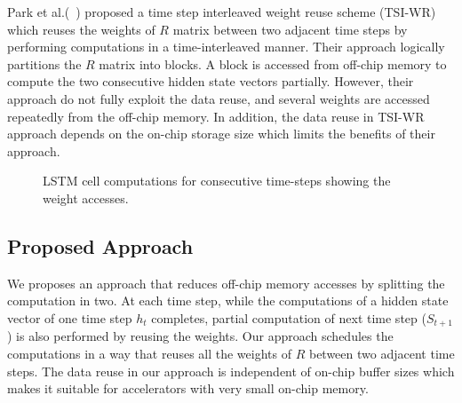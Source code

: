 \documentclass[a4paper,10pt]{article}
\begin{document}
Park et al.(~\cite{park2020time}) proposed a time step interleaved weight reuse scheme (TSI-WR) which reuses the weights of $R$ matrix between two adjacent time steps by performing computations in a time-interleaved manner. Their approach logically partitions the $R$ matrix into blocks. A block is accessed from off-chip memory to compute the two consecutive hidden state vectors partially. However, their approach do not fully exploit the data reuse, and several weights are accessed repeatedly from the off-chip memory. In addition, the data reuse in TSI-WR approach depends on the on-chip storage size which limits the benefits of their approach.
\begin{figure}[!htb]
	\centering
	\hfil
	\hfil	
	\caption{LSTM cell computations for consecutive time-steps showing the weight accesses.}
	\label{fig:introToApproach}
	\vspace{-1.0em}	
\end{figure}
\subsection{Proposed Approach}
We proposes an approach that reduces off-chip memory accesses by splitting the computation in two. At each time step, while the computations of a hidden state vector of one time step $h_t$ completes, partial computation of next time step ($S_{t+1}$) is also performed by reusing the weights.
Our approach schedules the computations in a way that reuses all the weights of $R$ between two adjacent time steps. The data reuse in our approach is independent of on-chip buffer sizes which makes it suitable for accelerators with very small on-chip memory.
\end{document}
